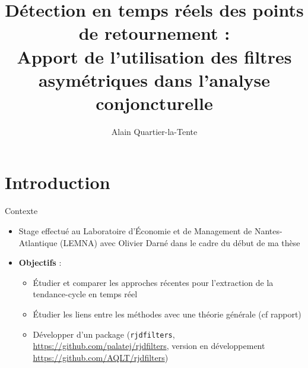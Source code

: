 \documentclass[10pt,xcolor=table,color={dvipsnames,usenames},ignorenonframetext,usepdftitle=false,french]{beamer}
\title{Détection en temps réels des points de retournement :\\
Apport de l'utilisation des filtres asymétriques dans l'analyse
conjoncturelle}
\author{Alain Quartier-la-Tente}
\date{}
\providecommand{\tightlist}{%
  \setlength{\parskip}{0pt}
  }
\newcommand\1{\mathds{1}}
\begin{document}
\begin{frame}
\titlepage
\end{frame}

\hypertarget{introduction}{%
\section{Introduction}\label{introduction}}

\begin{frame}[fragile]{Contexte}
\protect\hypertarget{contexte}{}
\begin{itemize}
\tightlist
\item
  Stage effectué au Laboratoire d'Économie et de Management de
  Nantes-Atlantique (LEMNA) avec Olivier Darné dans le cadre du début de
  ma thèse
\end{itemize}

\bigskip

\pause

\begin{itemize}
\item
  \textbf{Objectifs} :

  \begin{itemize}
  \item
    Étudier et comparer les approches récentes pour l'extraction de la
    tendance-cycle en temps réel \pause
  \item
    Étudier les liens entre les méthodes avec une théorie générale (cf
    rapport) \pause
  \item
    Développer d'un package  (\texttt{rjdfilters},
    \url{https://github.com/palatej/rjdfilters}, version en
    développement \url{https://github.com/AQLT/rjdfilters})
  \end{itemize}
\end{itemize}
\end{frame}
\end{document}
